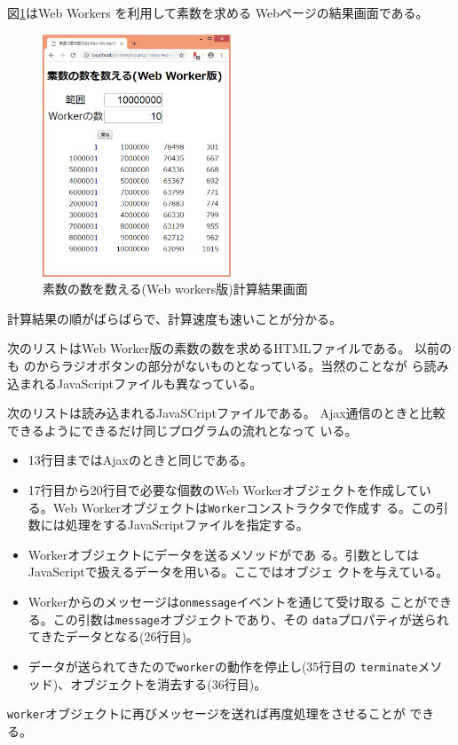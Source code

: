    \begin{Exec}\upshape
    図\ref{countPrimes-workers-res}はWeb Workers を利用して素数を求める
    Webページの結果画面である。
    \begin{figure}[ht]
	\begin{center}
	 \includegraphics[width=0.5\textwidth]{primes/countPrimes-workers-res.eps}
	\end{center}
 \caption{素数の数を数える(Web workers版)計算結果画面}\label{countPrimes-workers-res}
 \end{figure}

    計算結果の順がばらばらで、計算速度も速いことが分かる。
    
 次のリストはWeb Worker版の素数の数を求めるHTMLファイルである。
 以前のも のからラジオボタンの部分がないものとなっている。当然のことなが
 ら読み込まれるJavaScriptファイルも異なっている。

 次のリストは読み込まれるJavaSCriptファイルである。
 Ajax通信のときと比較できるようにできるだけ同じプログラムの流れとなって
 いる。
 \begin{itemize}
  \item 13行目まではAjaxのときと同じである。
  \item 17行目から20行目で必要な個数のWeb Workerオブジェクトを作成してい
        る。Web Workerオブジェクトは\Verb+Worker+コンストラクタで作成す
        る。この引数には処理をするJavaScriptファイルを指定する。
  \item Workerオブジェクトにデータを送るメソッドがであ
        る。引数としてはJavaScriptで扱えるデータを用いる。ここではオブジェ
        クトを与えている。
  \item Workerからのメッセージは\Verb+onmessage+イベントを通じて受け取る
        ことができる。この引数は\Verb+message+オブジェクトであり、その
        \Verb+data+プロパティが送られてきたデータとなる(26行目)。
  \item データが送られてきたので\Verb+worker+の動作を停止し(35行目の
        \Verb+terminate+メソッド)、オブジェクトを消去する(36行目)。
 \end{itemize}
 \Verb+worker+オブジェクトに再びメッセージを送れば再度処理をさせることが
 できる。


\end{Exec}
